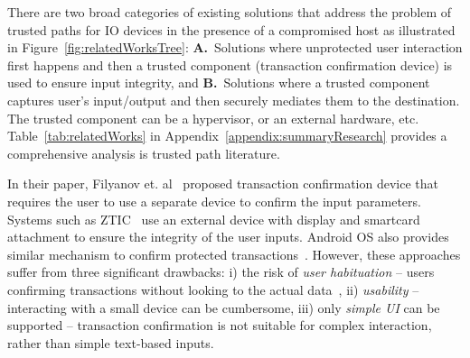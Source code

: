 There are two broad categories of existing solutions that address the problem of trusted paths for IO devices in the presence of a compromised host as illustrated in Figure~\ref{fig:relatedWorksTree}: \textbf{A.}~Solutions where unprotected user interaction first happens and then a trusted component (transaction confirmation device) is used to ensure input integrity,
and \textbf{B.}~Solutions where a trusted component captures user's input/output and then securely mediates them to the destination. The trusted component can be a hypervisor, or an external hardware, etc. Table~\ref{tab:relatedWorks} in Appendix~\ref{appendix:summaryResearch} provides a comprehensive analysis is trusted path literature.

 In their paper, Filyanov et. al~\cite{filyanov2011uni} proposed transaction confirmation device that requires the user to use a separate device to confirm the input parameters. Systems such as ZTIC~\cite{weigold2011secure} use an external device with display and smartcard attachment to ensure the integrity of the user inputs. Android OS also provides similar mechanism to confirm protected transactions~\cite{android_confirm}. 
However, these approaches suffer from three significant drawbacks: i) the risk of \emph{user habituation} -- users confirming transactions without looking to the actual data~\cite{anderson2016warning},
ii) \emph{usability} -- interacting with a small device can be cumbersome, iii) only \emph{simple UI} can be supported -- transaction confirmation is not suitable for complex interaction, rather than simple text-based inputs.


